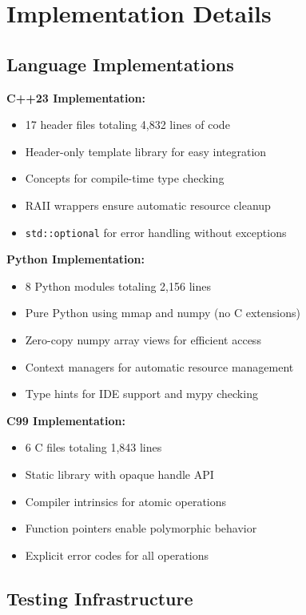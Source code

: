 \documentclass[11pt]{article}
\begin{document}
\section{Implementation Details}

\subsection{Language Implementations}

\textbf{C++23 Implementation:}
\begin{itemize}
\item 17 header files totaling 4,832 lines of code
\item Header-only template library for easy integration
\item Concepts for compile-time type checking
\item RAII wrappers ensure automatic resource cleanup
\item \texttt{std::optional} for error handling without exceptions
\end{itemize}

\textbf{Python Implementation:}
\begin{itemize}
\item 8 Python modules totaling 2,156 lines
\item Pure Python using mmap and numpy (no C extensions)
\item Zero-copy numpy array views for efficient access
\item Context managers for automatic resource management
\item Type hints for IDE support and mypy checking
\end{itemize}

\textbf{C99 Implementation:}
\begin{itemize}
\item 6 C files totaling 1,843 lines
\item Static library with opaque handle API
\item Compiler intrinsics for atomic operations
\item Function pointers enable polymorphic behavior
\item Explicit error codes for all operations
\end{itemize}

\subsection{Testing Infrastructure}
\end{document}
